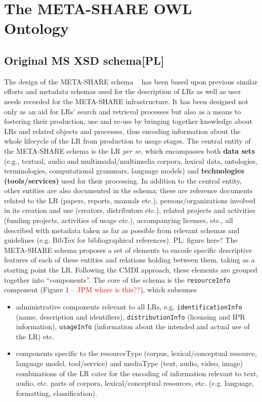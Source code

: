 \documentclass{llncs}
\begin{document}
\section{The META-SHARE OWL Ontology}
\label{sec:ontology}
\subsection{Original MS XSD schema[PL]}
\label{sec:xsd}
The design of the META-SHARE schema ~\cite{gavrilidou2012metashare} has been based upon previous similar efforts and metadata schemas used for the description of LRs as well as user needs recorded for the META-SHARE infrastructure. It has been designed not only as an aid for LRs' search and retrieval processes but also as a means to fostering their production, use and re-use by bringing together knowledge about LRs and related objects and processes, thus encoding information about the whole lifecycle of the LR from production to usage stages.
The central entity of the META-SHARE schema is the LR \textit{per se}, which encompasses both {\bf data sets} (e.g., textual, audio and multimodal/multimedia corpora, lexical data, ontologies, terminologies, computational grammars, language models) and {\bf technologies (tools/services)} used for their processing. 
In addition to the central entity, other entities are also documented in the schema; these are reference documents related to the LR (papers, reports,
manuals etc.), persons/organizations involved in its creation and use (creators, distributors etc.), related projects and activities (funding projects,
activities of usage etc.), accompanying licenses, etc., all described with metadata taken as far as possible from relevant schemas and guidelines (e.g. BibTex for bibliographical references). {PL: figure here?}
The META-SHARE schema proposes a set of elements to encode specific descriptive features of each of these entities and relations holding between them, taking as a starting point the LR. Following the CMDI approach, these elements are grouped together into ``components''. The core of the schema is the {\tt resourceInfo} component (Figure 1\textcolor{red}{ -- JPM where is this??}), which subsumes 
\begin{itemize}
\item administrative components relevant to all LRs, e.g. {\tt identificationInfo} (name, description and identifiers), {\tt distributionInfo} (licensing and IPR information), {\tt usageInfo} (information about the intended and actual use of the LR) etc.
\item components specific to the resourceType (corpus, lexical/conceptual resource, language model, tool/service) and mediaType (text, audio, video, image) combinations of the LR cater for the encoding of information relevant to text, audio, etc. parts of corpora, lexical/conceptual resources, etc. (e.g. language, formatting, classification).
\end{itemize} 
\end{document}
